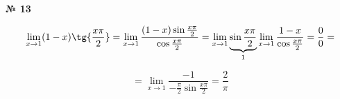 \documentclass{article}
\begin{document}
\textbf{№ 13} 

\begingroup
\Large

$$ \lim\limits_{x \to 1} (1-x)\tg{\frac{x\pi}{2}}
= \lim\limits_{x \to 1} \frac{(1-x)\sin{\frac{x\pi}{2}}}{\cos{\frac{x\pi}{2}}}
= \lim\limits_{x \to 1} \underbrace{\sin{\frac{x\pi}{2}}}_{1} \lim\limits_{x \to 1} \frac{1-x}{\cos{\frac{x\pi}{2}}}
= \frac{0}{0}
= $$

$$ = \lim\limits_{x \to 1} \frac{-1}{-\frac{\pi}{2}\sin{\frac{x\pi}{2}}}
= \frac{2}{\pi} $$

\endgroup
\end{document}
